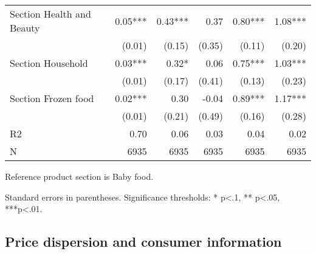 \documentclass[english]{article}
\begin{document}
\begin{table}[H]
\begin{threeparttable}
\begin{tabular}{lrrrrr}
Section Health and Beauty                & 0.05***  & 0.43***  & 0.37     & 0.80***  & 1.08***   \\
                                         & (0.01)   & (0.15)   & (0.35)   & (0.11)   & (0.20)    \\
Section Household                        & 0.03***  & 0.32*    & 0.06     & 0.75***  & 1.03***   \\
                                         & (0.01)   & (0.17)   & (0.41)   & (0.13)   & (0.23)    \\
Section Frozen food                      & 0.02***  & 0.30     & -0.04    & 0.89***  & 1.17***   \\
                                         & (0.01)   & (0.21)   & (0.49)   & (0.16)   & (0.28)    \\
\midrule
R2                                       & 0.70     & 0.06     & 0.03     & 0.04     & 0.02      \\
N                                        & 6935     & 6935     & 6935     & 6935     & 6935      \\
\bottomrule
\bottomrule
\end{tabular}
\begin{tablenotes}
      \small
      \item Reference product section is Baby food.
			\item Standard errors in parentheses. Significance thresholds: * p<.1, ** p<.05, ***p<.01.
\end{tablenotes}
\end{threeparttable}
\end{table}

\subsection{Price dispersion and consumer information}

\end{document}
